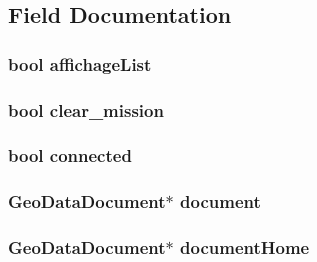\subsection{Field Documentation}
\hypertarget{a00008_aef1d7c2fea653fb1d729b2f40b2c2c53}{
\subsubsection[{affichage\-List}]{\setlength{\rightskip}{0pt plus 5cm}bool affichage\-List\hspace{0.3cm}{\ttfamily [private]}}}\label{a00008_aef1d7c2fea653fb1d729b2f40b2c2c53}
\hypertarget{a00008_a4ea0f7bc01af5b4359d7be6998600e13}{
\subsubsection[{clear\-\_\-mission}]{\setlength{\rightskip}{0pt plus 5cm}bool clear\-\_\-mission\hspace{0.3cm}{\ttfamily [private]}}}\label{a00008_a4ea0f7bc01af5b4359d7be6998600e13}
\hypertarget{a00008_ab36823025f12a809217f7771125658c2}{
\subsubsection[{connected}]{\setlength{\rightskip}{0pt plus 5cm}bool connected\hspace{0.3cm}{\ttfamily [private]}}}\label{a00008_ab36823025f12a809217f7771125658c2}
\hypertarget{a00008_a8b0f68f97ddd8c30ad31efa6919778ee}{
\subsubsection[{document}]{\setlength{\rightskip}{0pt plus 5cm}Geo\-Data\-Document$\ast$ document\hspace{0.3cm}{\ttfamily [private]}}}\label{a00008_a8b0f68f97ddd8c30ad31efa6919778ee}
\hypertarget{a00008_a5485f3186e5ee43d5cb40af7a555bb7e}{
\subsubsection[{document\-Home}]{\setlength{\rightskip}{0pt plus 5cm}Geo\-Data\-Document$\ast$ document\-Home\hspace{0.3cm}{\ttfamily [private]}}}\label{a00008_a5485f3186e5ee43d5cb40af7a555bb7e}
